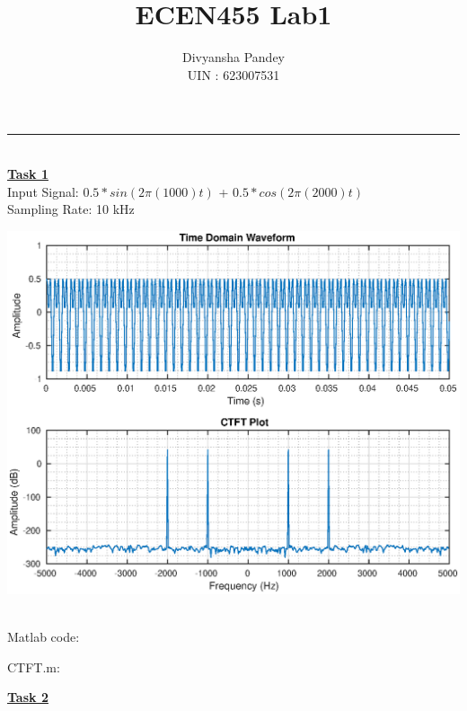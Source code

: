 \documentclass[11pt]{article}
\begin{document}
\title{\vspace{-0.5in}ECEN455 Lab1}
\author{Divyansha Pandey \\ UIN : 623007531}
\date{}
\maketitle
\rule{\textwidth}{1pt}
\vspace{10pt}\\
\textbf{\underline{\LARGE{Task 1}}} \\

Input Signal: $0.5*sin(2\pi(1000)t)$ + $0.5*cos(2\pi(2000)t)$\\
Sampling Rate: 10 kHz
\vspace{10pt}\\ 
\centerline{\includegraphics[scale = 1]{./Task1.eps}}\\
\newpage
Matlab code:

CTFT.m:

\newpage

\textbf{\underline{\LARGE{Task 2}}} \\
\end{document}
